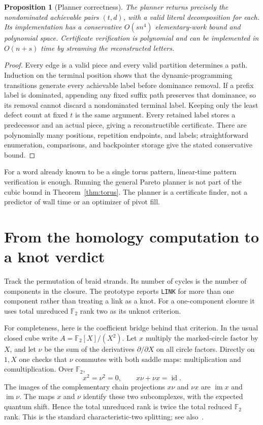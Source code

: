 \documentclass[11pt,letterpaper]{article}
\newtheorem{proposition}[theorem]{Proposition}
\theoremstyle{remark}\newtheorem{remark}[theorem]{Remark}
\newcommand{\F}{\mathbb F}
\newcommand{\id}{\operatorname{id}}
\begin{document}
\begin{proposition}[Planner correctness]\label{prop:planner}
The planner returns precisely the nondominated achievable pairs $(t,d)$, with a valid literal decomposition for each. Its implementation has a conservative $O(sn^4)$ elementary-work bound and polynomial space. Certificate verification is polynomial and can be implemented in $O(n+s)$ time by streaming the reconstructed letters.
\end{proposition}
\begin{proof}
Every edge is a valid piece and every valid partition determines a path. Induction on the terminal position shows that the dynamic-programming transitions generate every achievable label before dominance removal. If a prefix label is dominated, appending any fixed suffix path preserves that dominance, so its removal cannot discard a nondominated terminal label. Keeping only the least defect count at fixed $t$ is the same argument. Every retained label stores a predecessor and an actual piece, giving a reconstructible certificate. There are polynomially many positions, repetition endpoints, and labels; straightforward enumeration, comparisons, and backpointer storage give the stated conservative bound.
\end{proof}
For a word already known to be a single torus pattern, linear-time pattern verification is enough. Running the general Pareto planner is not part of the cubic bound in Theorem~\ref{thm:torus}. The planner is a certificate finder, not a predictor of wall time or an optimizer of pivot fill.

\section{From the homology computation to a knot verdict}\label{sec:verdict}
Track the permutation of braid strands. Its number of cycles is the number of components in the closure. The prototype reports \texttt{LINK} for more than one component rather than treating a link as a knot. For a one-component closure it uses total unreduced $\F_2$ rank two as its unknot criterion.

For completeness, here is the coefficient bridge behind that criterion. In the usual closed cube write $A=\F_2[X]/(X^2)$. Let $x$ multiply the marked-circle factor by $X$, and let $\nu$ be the sum of the derivatives $\partial/\partial X$ on all circle factors. Directly on $1,X$ one checks that $\nu$ commutes with both saddle maps: multiplication and comultiplication. Over $\F_2$,
\[
 x^2=\nu^2=0,\qquad x\nu+\nu x=\id.
\]
The images of the complementary chain projections $x\nu$ and $\nu x$ are $\operatorname{im}x$ and $\operatorname{im}\nu$. The maps $x$ and $\nu$ identify these two subcomplexes, with the expected quantum shift. Hence the total unreduced rank is twice the total reduced $\F_2$ rank. This is the standard characteristic-two splitting; see also~\cite{Shu}.
\end{document}

